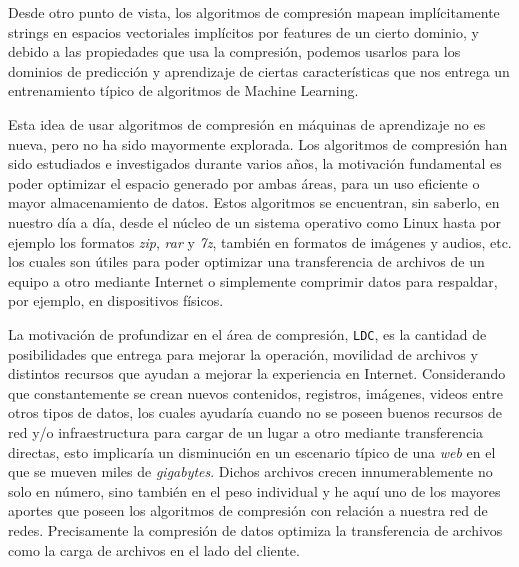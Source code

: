 




Desde otro punto de vista, los algoritmos de compresión mapean implícitamente strings en espacios vectoriales implícitos por features de un cierto dominio, y debido a las propiedades que usa la  compresión, podemos usarlos para los dominios de predicción y aprendizaje de ciertas características que nos entrega un entrenamiento típico de algoritmos de Machine Learning.

Esta idea de usar algoritmos de compresión en máquinas de aprendizaje no es nueva, pero no ha sido mayormente explorada. Los algoritmos de compresión han sido estudiados e investigados durante varios años, la motivación fundamental es poder optimizar el espacio generado por ambas áreas, para un uso eficiente o mayor almacenamiento de datos. Estos algoritmos se encuentran, sin saberlo, en nuestro día a día, desde el núcleo de un sistema operativo como Linux hasta por ejemplo los formatos \emph{zip}, \emph{rar} y \emph{7z}, también en formatos de imágenes y audios, etc. los cuales son útiles para poder optimizar una transferencia de archivos de un equipo a otro mediante Internet o simplemente comprimir datos para respaldar, por ejemplo, en dispositivos físicos. 

La motivación de profundizar en el área de compresión, \texttt{LDC}, es la cantidad de posibilidades que entrega para mejorar la operación, movilidad de archivos y distintos recursos que ayudan a mejorar la experiencia en Internet. Considerando que constantemente se crean nuevos contenidos, registros, imágenes, videos entre otros tipos de datos,  los cuales ayudaría cuando no se poseen buenos recursos de red y/o infraestructura para cargar de un lugar a otro mediante  transferencia directas, esto implicaría un disminución en un escenario típico de una \emph{web} en el que se mueven miles de \emph{gigabytes}. Dichos archivos crecen innumerablemente no solo en número, sino también en el peso individual y he aquí uno de los mayores aportes que poseen los algoritmos de compresión con relación a nuestra red de redes. Precisamente la compresión de datos optimiza la transferencia de archivos como la carga de archivos en el lado del cliente.

